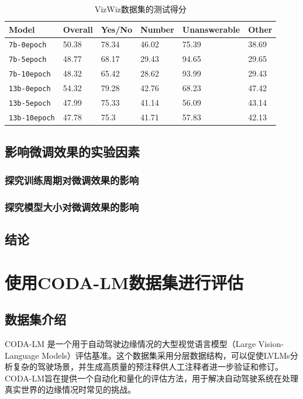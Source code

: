 \documentclass[
    linespread = 1.25
]{ctexart}
\begin{document}
\begin{table}[hbt]
  \centering
  \caption{VizWiz数据集的测试得分}
  \label{tab:vizwiz}
  \begin{tabular}{@{}llllll@{}}
  \toprule
  Model            & Overall & Yes/No & Number & Unanswerable & Other \\ \midrule
  \texttt{7b-0epoch}   & 50.38   & 78.34  & 46.02  & 75.39        & 38.69 \\
  \texttt{7b-5epoch}   & 48.77   & 68.17  & 29.43  & 94.65        & 29.65 \\
  \texttt{7b-10epoch}  & 48.32   & 65.42  & 28.62  & 93.99        & 29.43 \\
  \texttt{13b-0epoch}  & 54.32   & 79.28  & 42.76  & 68.23        & 47.42 \\
  \texttt{13b-5epoch}  & 47.99   & 75.33  & 41.14  & 56.09        & 43.14 \\
  \texttt{13b-10epoch} & 47.78   & 75.3   & 41.71  & 57.83        & 42.13 \\ \bottomrule
  \end{tabular}
\end{table}

\subsection{影响微调效果的实验因素}

\subsubsection{探究训练周期对微调效果的影响}

\subsubsection{探究模型大小对微调效果的影响}

\subsection{结论}

\section{使用CODA-LM数据集进行评估}
\subsection{数据集介绍}
CODA-LM 是一个用于自动驾驶边缘情况的大型视觉语言模型（Large Vision-Language Models）评估基准。这个数据集采用分层数据结构，可以促使LVLMs分析复杂的驾驶场景，并生成高质量的预注释供人工注释者进一步验证和修订。CODA-LM旨在提供一个自动化和量化的评估方法，用于解决自动驾驶系统在处理真实世界的边缘情况时常见的挑战。
\end{document}
